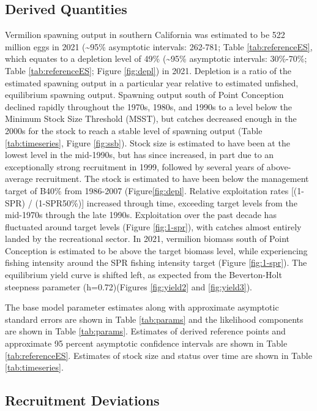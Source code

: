 \documentclass[
  english,
  a4paper,
]{article}
\begin{document}
\hypertarget{derived-quantities}{%
\subsection{Derived Quantities}\label{derived-quantities}}

Vermilion spawning output in southern California was estimated to be 522 million eggs in 2021 (\textasciitilde95\% asymptotic intervals: 262-781; Table \ref{tab:referenceES}, which equates to a depletion level of 49\% (\textasciitilde95\% asymptotic intervals: 30\%-70\%; Table \ref{tab:referenceES}; Figure \ref{fig:depl}) in 2021. Depletion is a ratio of the estimated spawning output in a particular year relative to estimated unfished, equilibrium spawning output. Spawning output south of Point Conception declined rapidly throughout the 1970s, 1980s, and 1990s to a level below the Minimum Stock Size Threshold (MSST), but catches decreased enough in the 2000s for the stock to reach a stable level of spawning output (Table \ref{tab:timeseries}, Figure \ref{fig:ssb}). Stock size is estimated to have been at the lowest level in the mid-1990s, but has since increased, in part due to an exceptionally strong recruitment in 1999, followed by several years of above-average recruitment. The stock is estimated to have been below the management target of B40\% from 1986-2007 (Figure\ref{fig:depl}. Relative exploitation rates {[}(1-SPR) / (1-SPR50\%){]} increased through time, exceeding target levels from the mid-1970s through the late 1990s. Exploitation over the past decade has fluctuated around target levels (Figure \ref{fig:1-spr}), with catches almost entirely landed by the recreational sector. In 2021, vermilion biomass south of Point Conception is estimated to be above the target biomass level, while experiencing fishing intensity around the SPR fishing intensity target (Figure \ref{fig:1-spr}). The equilibrium yield curve is shifted left, as expected from the Beverton-Holt steepness parameter (h=0.72)(Figures \ref{fig:yield2} and \ref{fig:yield3}).

The base model parameter estimates along with approximate asymptotic standard errors are shown in Table \ref{tab:params} and the likelihood components are shown in Table \ref{tab:params}. Estimates of derived reference points and approximate 95 percent asymptotic confidence intervals are shown in Table \ref{tab:referenceES}. Estimates of stock size and status over time are shown in Table \ref{tab:timeseries}.

\hypertarget{recruitment-deviations}{%
\subsection{Recruitment Deviations}\label{recruitment-deviations}}
\end{document}
